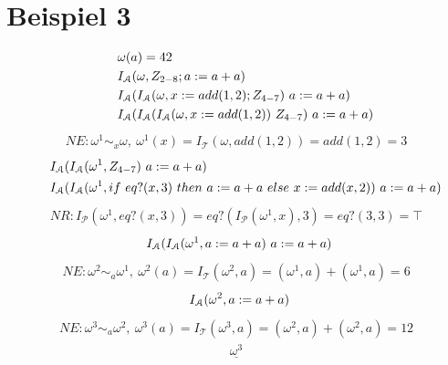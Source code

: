 \documentclass[12pt,runningheads,a4paper]{llncs}
\begin{document}
\section*{Beispiel 3}
\begin{align}
&\indent\omega(a) = 42\\
&\indent I_\mathcal{A}(\omega, Z_{2-8}; a := a+a)\\
&\indent I_\mathcal{A}(I_\mathcal{A}(\omega, x := add(1,2); Z_{4-7})\ a := a + a)\\
&\indent I_\mathcal{A}( I_\mathcal{A}(I_\mathcal{A}(\omega, x := add(1,2))\ Z_{4-7})\ a := a + a)
\end{align}
\begin{gather*}
NE: \omega^1 \sim_x \omega,\: \omega^1(x) = I_\mathcal{T}(\omega, add(1,2)) = add(1,2) = 3
\end{gather*}
\begin{align}
&\indent I_\mathcal{A}(I_\mathcal{A}(\omega^1, Z_{4-7})\ a := a+a)\\
&\indent I_\mathcal{A}(I_\mathcal{A}(\omega^1, if\ eq?(x,3)\ then\ a := a + a\ else\ x := add(x,2))\ a := a+a)
\end{align}
\begin{gather*}
NR: I_\mathcal{P}(\omega^1, eq?(x,3)) = eq?(I_\mathcal{P}(\omega^1,x),3) = eq?(3,3) = \top
\end{gather*}
\begin{align}
&\indent I_\mathcal{A}(I_\mathcal{A}(\omega^1, a := a + a)\ a := a+a)
\end{align}
\begin{gather*}
NE: \omega^2 \sim_a \omega^1,\: \omega^2(a) = I_\mathcal{T}(\omega^2,a ) = (\omega^1,a )+(\omega^1,a )  = 6
\end{gather*}
\begin{align}
&\indent I_\mathcal{A}(\omega^2, a := a+a)
\end{align}
\begin{gather*}
NE: \omega^3 \sim_a \omega^2,\: \omega^3(a) = I_\mathcal{T}(\omega^3,a ) = (\omega^2,a )+(\omega^2,a )  = 12
\end{gather*}
\begin{align}
\underline{\omega^3}
\end{align}
\end{document}
